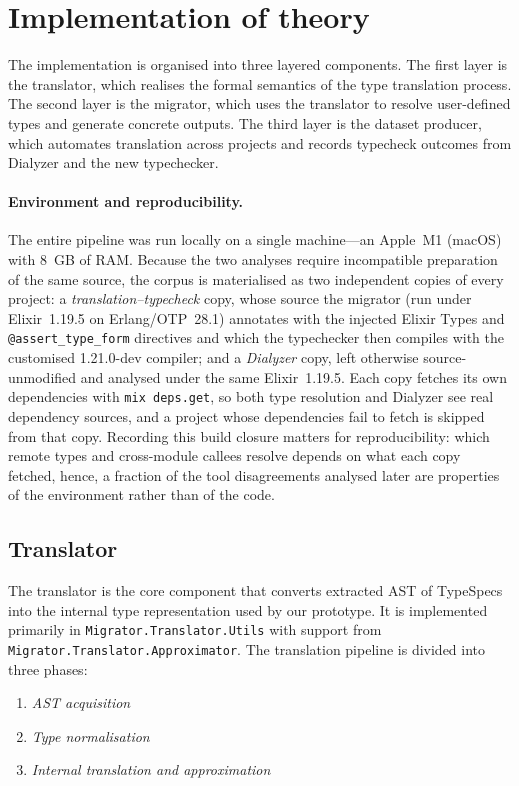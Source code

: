\section{Implementation of theory}

The implementation is organised into three layered components.
The first layer is the translator, which realises the formal semantics of the type translation process.
The second layer is the migrator, which uses the translator to resolve user-defined types and generate concrete outputs.
The third layer is the dataset producer, which automates translation across projects and records typecheck outcomes from Dialyzer and the new typechecker.

\paragraph{Environment and reproducibility.}
The entire pipeline was run locally on a single machine---an Apple~M1 (macOS) with 8~GB of RAM.
Because the two analyses require incompatible preparation of the same source, the corpus is materialised as two independent copies of every project: a \emph{translation--typecheck} copy, whose source the migrator (run under Elixir~1.19.5 on Erlang/OTP~28.1) annotates with the injected Elixir Types and \texttt{@assert\_type\_form} directives and which the typechecker then compiles with the customised 1.21.0-dev compiler; and a \emph{Dialyzer} copy, left otherwise source-unmodified and analysed under the same Elixir~1.19.5.
Each copy fetches its own dependencies with \texttt{mix deps.get}, so both type resolution and Dialyzer see real dependency sources, and a project whose dependencies fail to fetch is skipped from that copy.
Recording this build closure matters for reproducibility: which remote types and cross-module callees resolve depends on what each copy fetched, hence, a fraction of the tool disagreements analysed later are properties of the environment rather than of the code.

\subsection{Translator}\label{sec:implementation-of-translator}

The translator is the core component that converts extracted AST of TypeSpecs into the internal type representation used by our prototype.
It is implemented primarily in \texttt{Migrator.Translator.Utils} with support from \texttt{Migrator.Translator.Approximator}.
The translation pipeline is divided into three phases:
\begin{enumerate}
    \item \textit{AST acquisition}
    \item \textit{Type normalisation}
    \item \textit{Internal translation and approximation}
\end{enumerate}


